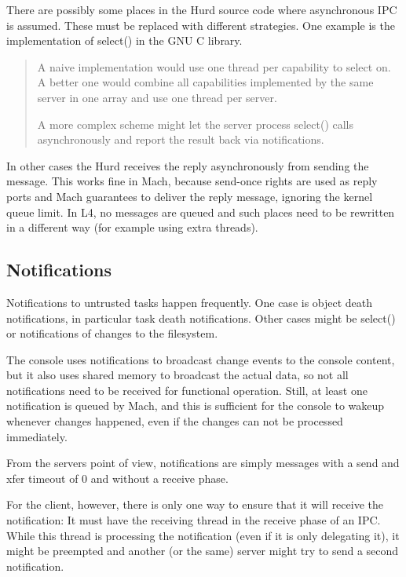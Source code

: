 \documentclass[9pt,a4paper]{extarticle}
\newenvironment{comment}{\footnotesize \begin{quote}}{\end{quote}}
\begin{document}
There are possibly some places in the Hurd source code where
asynchronous IPC is assumed.  These must be replaced with different
strategies.  One example is the implementation of select() in the GNU
C library.

\begin{comment}
  A naive implementation would use one thread per capability to select
  on.  A better one would combine all capabilities implemented by the
  same server in one array and use one thread per server.
  
  A more complex scheme might let the server process select() calls
  asynchronously and report the result back via notifications.
\end{comment}

In other cases the Hurd receives the reply asynchronously from sending
the message.  This works fine in Mach, because send-once rights are
used as reply ports and Mach guarantees to deliver the reply message,
ignoring the kernel queue limit.  In L4, no messages are queued and
such places need to be rewritten in a different way (for example using
extra threads).


\subsection{Notifications}

Notifications to untrusted tasks happen frequently.  One case is
object death notifications, in particular task death notifications.
Other cases might be select() or notifications of changes to the
filesystem.

The console uses notifications to broadcast change events to the
console content, but it also uses shared memory to broadcast the
actual data, so not all notifications need to be received for
functional operation.  Still, at least one notification is queued by
Mach, and this is sufficient for the console to wakeup whenever
changes happened, even if the changes can not be processed
immediately.
  
From the servers point of view, notifications are simply messages with
a send and xfer timeout of 0 and without a receive phase.

For the client, however, there is only one way to ensure that it will
receive the notification: It must have the receiving thread in the
receive phase of an IPC.  While this thread is processing the
notification (even if it is only delegating it), it might be preempted
and another (or the same) server might try to send a second
notification.
\end{document}
